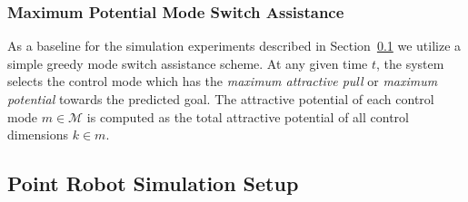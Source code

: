 \documentclass[letterpaper, 10 pt, conference]{ieeeconf}  %
\begin{document}
\subsubsection{Maximum Potential Mode Switch Assistance}\label{sssec:baseline}
As a baseline for the simulation experiments described in Section~\ref{ssec:sim} we utilize a simple greedy mode switch assistance scheme. At any given time $t$, the system selects the control mode which has the \textit{maximum attractive pull} or \textit{maximum potential} towards the predicted goal. 
The attractive potential of each control mode $m \in \mathcal{M}$ is computed as the total attractive potential of all control dimensions $k \in m$.

\subsection{Point Robot Simulation Setup}\label{ssec:sim}
\end{document}
